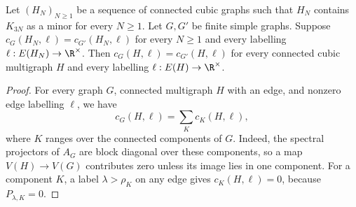 \begin{lemma}\label{lem:cubic-coefficient-transfer}
 Let $(H_N)_{N\geq1}$ be a sequence of connected cubic graphs such that
 $H_N$ contains $K_{3N}$ as a minor for every $N\geq1$.
 Let $G,G'$ be finite simple graphs. Suppose
 $c_G(H_N,\ell)=c_{G'}(H_N,\ell)$ for every $N\geq1$ and every
 labelling $\ell:E(H_N)\to\R^\times$.
 Then $c_G(H,\ell)=c_{G'}(H,\ell)$ for every connected cubic
 multigraph $H$ and every labelling $\ell:E(H)\to\R^\times$.
\end{lemma}
\begin{proof}
For every graph $G$, connected multigraph $H$ with an edge, and nonzero
edge labelling $\ell$, we have
\begin{equation}\label{eq:component-contributions}
 c_G(H,\ell)=\sum_K c_K(H,\ell),
\end{equation}
where $K$ ranges over the connected components of $G$.
Indeed, the spectral projectors of $A_G$ are block diagonal over these
components, so a map $V(H)\to V(G)$ contributes zero unless its image
lies in one component.
For a component $K$, a label $\lambda>\rho_K$ on any edge gives
$c_K(H,\ell)=0$, because $P_{\lambda,K}=0$.


\end{proof}

